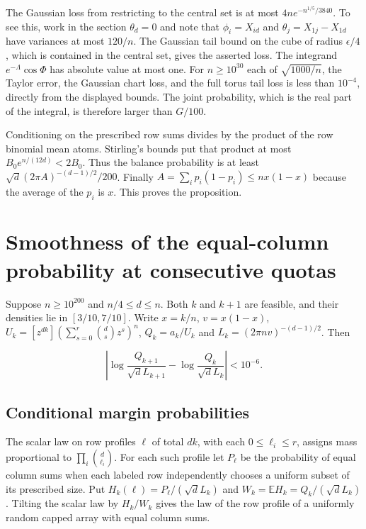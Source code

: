 \documentclass[11pt]{article}
\begin{document}
The Gaussian loss from restricting to the central set is at most $4n e^{-n^{1/5}/3840}$. To see this, work in the section $\theta_d=0$ and note that $\phi_i=X_{id}$ and $\theta_j=X_{1j}-X_{1d}$ have variances at most $120/n$. The Gaussian tail bound on the cube of radius $\epsilon/4$, which is contained in the central set, gives the asserted loss. The integrand $e^{-\Lambda}\cos\Phi$ has absolute value at most one. For $n\ge10^{30}$ each of $\sqrt{1000/n}$, the Taylor error, the Gaussian chart loss, and the full torus tail loss is less than $10^{-4}$, directly from the displayed bounds. The joint probability, which is the real part of the integral, is therefore larger than $G/100$.

Conditioning on the prescribed row sums divides by the product of the row binomial mean atoms. Stirling's bounds put that product at most $B_0e^{n/(12d)}<2B_0$. Thus the balance probability is at least $\sqrt d(2\pi A)^{-(d-1)/2}/200$. Finally $A=\sum_i p_i(1-p_i)\le nx(1-x)$ because the average of the $p_i$ is $x$. This proves the proposition.

\section{Smoothness of the equal-column probability at consecutive quotas}

Suppose $n\ge 10^{200}$ and $n/4\le d\le n$. Both $k$ and $k+1$ are feasible, and their densities lie in $[3/10,7/10]$. Write $x=k/n$, $v=x(1-x)$, $U_k=[z^{dk}](\sum_{s=0}^r\binom ds z^s)^n$, $Q_k=a_k/U_k$ and $L_k=(2\pi nv)^{-(d-1)/2}$. Then

\[
\left|\log\frac{Q_{k+1}}{\sqrt d L_{k+1}}-\log\frac{Q_k}{\sqrt d L_k}\right|<10^{-6}.
\]

\subsection{Conditional margin probabilities}

The scalar law on row profiles $\ell$ of total $dk$, with each $0\le\ell_i\le r$, assigns mass proportional to $\prod_i\binom d{\ell_i}$. For each such profile let $P_\ell$ be the probability of equal column sums when each labeled row independently chooses a uniform subset of its prescribed size. Put $H_k(\ell)=P_\ell/(\sqrt d L_k)$ and $W_k=\mathbb E H_k=Q_k/(\sqrt d L_k)$. Tilting the scalar law by $H_k/W_k$ gives the law of the row profile of a uniformly random capped array with equal column sums.
\end{document}
